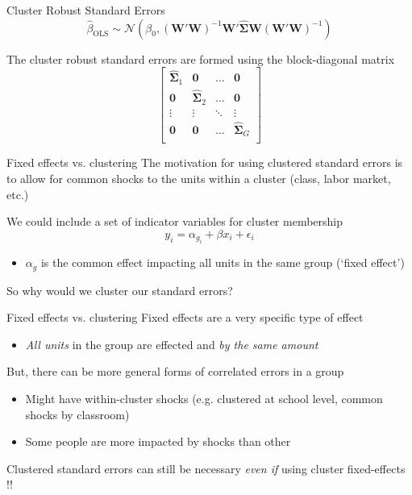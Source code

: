 \documentclass[aspectratio=169,t,11pt,table]{beamer}
\begin{document}
\begin{frame}{Cluster Robust Standard Errors}
  \vspace*{-\bigskipamount}
  $$
    \hat{\beta}_{\text{OLS}} \sim 
    \mathcal{N}\left( \beta_0, \left(\bm{W}' \bm{W} \right)^{-1} \bm{W}' \hat{\bm{\Sigma}} \bm{W} \left(\bm{W}' \bm{W} \right)^{-1} \right)
  $$

  \bigskip
  The cluster robust standard errors are formed using the \alert{block-diagonal matrix}
  $$
    \begin{bmatrix}
      \hat{\bm{\Sigma}}_{1} & \bm{0}          & \dots  & \bm{0} \\
      \bm{0}          & \hat{\bm{\Sigma}}_{2} & \dots  & \bm{0} \\
      \vdots          & \vdots          & \ddots & \vdots \\
      \bm{0}          & \bm{0}          & \dots  & \hat{\bm{\Sigma}}_{G} \\
    \end{bmatrix}
  $$
\end{frame}

\begin{frame}{Fixed effects vs. clustering}
  The motivation for using clustered standard errors is to allow for common shocks to the units within a cluster (class, labor market, etc.)

  \bigskip
  We could include a set of indicator variables for cluster membership
  $$
    y_{i} = \alpha_{g_i} + \beta x_{i} + \epsilon_{i}
  $$
  
  \begin{itemize}
    \item $\alpha_g$ is the common effect impacting all units in the same group (`fixed effect')
  \end{itemize}

  \bigskip
  So why would we cluster our standard errors?
\end{frame}

\begin{frame}{Fixed effects vs. clustering}
  Fixed effects are a very specific type of effect
  \begin{itemize}
    \item \emph{All units} in the group are effected and \emph{by the same amount}
  \end{itemize}

  \pause
  \bigskip
  But, there can be more general forms of correlated errors in a group
  \begin{itemize}
    \item Might have within-cluster shocks (e.g. clustered at school level, common shocks by classroom)
    
    \item Some people are more impacted by shocks than other
  \end{itemize}

  \bigskip
  Clustered standard errors can still be necessary \emph{even if} using cluster fixed-effects !!
\end{frame}
\end{document}
